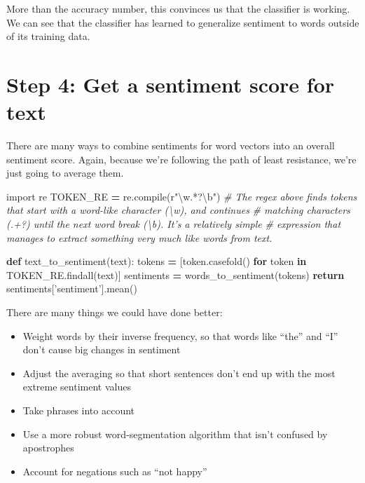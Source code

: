 \documentclass[]{book}
\newenvironment{Shaded}{\begin{snugshade}}{\end{snugshade}}
\newcommand{\KeywordTok}[1]{\textcolor[rgb]{0.13,0.29,0.53}{\textbf{#1}}}
\newcommand{\StringTok}[1]{\textcolor[rgb]{0.31,0.60,0.02}{#1}}
\newcommand{\VerbatimStringTok}[1]{\textcolor[rgb]{0.31,0.60,0.02}{#1}}
\newcommand{\ImportTok}[1]{#1}
\newcommand{\CommentTok}[1]{\textcolor[rgb]{0.56,0.35,0.01}{\textit{#1}}}
\newcommand{\ControlFlowTok}[1]{\textcolor[rgb]{0.13,0.29,0.53}{\textbf{#1}}}
\newcommand{\OperatorTok}[1]{\textcolor[rgb]{0.81,0.36,0.00}{\textbf{#1}}}
\newcommand{\BuiltInTok}[1]{#1}
\newcommand{\NormalTok}[1]{#1}
\providecommand{\tightlist}{%
  \setlength{\itemsep}{0pt}\setlength{\parskip}{0pt}}
\theoremstyle{definition}
\theoremstyle{definition}
\theoremstyle{definition}
\theoremstyle{remark}
\begin{document}
More than the accuracy number, this convinces us that the classifier is
working. We can see that the classifier has learned to generalize
sentiment to words outside of its training data.

\section{Step 4: Get a sentiment score for
text}\label{step-4-get-a-sentiment-score-for-text}

There are many ways to combine sentiments for word vectors into an
overall sentiment score. Again, because we're following the path of
least resistance, we're just going to average them.

\begin{Shaded}
\begin{Highlighting}[]
\ImportTok{import}\NormalTok{ re}
\NormalTok{TOKEN_RE }\OperatorTok{=}\NormalTok{ re.}\BuiltInTok{compile}\NormalTok{(}\VerbatimStringTok{r"\textbackslash{}w.*?\textbackslash{}b"}\NormalTok{)}
\CommentTok{# The regex above finds tokens that start with a word-like character (\textbackslash{}w), and continues}
\CommentTok{# matching characters (.+?) until the next word break (\textbackslash{}b). It's a relatively simple}
\CommentTok{# expression that manages to extract something very much like words from text.}


\KeywordTok{def}\NormalTok{ text_to_sentiment(text):}
\NormalTok{    tokens }\OperatorTok{=}\NormalTok{ [token.casefold() }\ControlFlowTok{for}\NormalTok{ token }\KeywordTok{in}\NormalTok{ TOKEN_RE.findall(text)]}
\NormalTok{    sentiments }\OperatorTok{=}\NormalTok{ words_to_sentiment(tokens)}
    \ControlFlowTok{return}\NormalTok{ sentiments[}\StringTok{'sentiment'}\NormalTok{].mean()}
\end{Highlighting}
\end{Shaded}

There are many things we could have done better:

\begin{itemize}
\tightlist
\item
  Weight words by their inverse frequency, so that words like ``the''
  and ``I'' don't cause big changes in sentiment
\item
  Adjust the averaging so that short sentences don't end up with the
  most extreme sentiment values
\item
  Take phrases into account
\item
  Use a more robust word-segmentation algorithm that isn't confused by
  apostrophes
\item
  Account for negations such as ``not happy''
\end{itemize}
\end{document}
